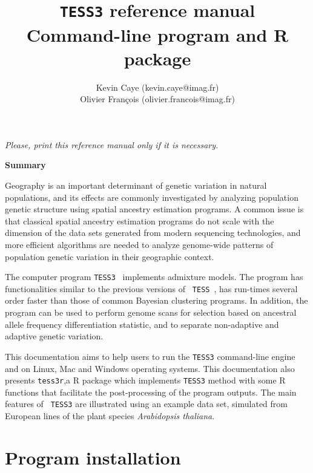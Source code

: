 \documentclass[10pt,a4paper]{article}
\title{{\tt TESS3} reference manual \\
Command-line program and R package
}
\author{
        Kevin Caye (kevin.caye@imag.fr)\\
        Olivier Fran\c cois (olivier.francois@imag.fr)\\
}
\begin{document}
\maketitle
\begin{center}
{\it Please, print this reference manual only if it is necessary.}
\end{center}

\vspace{.5cm}

\begin{center} {\bf Summary}
\end{center}


\vspace{.5cm}

Geography is an important determinant of genetic variation in natural 
populations, and its effects are commonly investigated by analyzing population 
genetic structure using spatial ancestry estimation programs. A common issue is 
that classical spatial ancestry estimation programs do not scale with the 
dimension of the data sets generated from modern sequencing technologies, and 
more efficient algorithms are needed to analyze genome-wide patterns of 
population genetic variation in their geographic context.

The computer program {\tt TESS3}~\cite{TESS3} implements admixture models. The program has 
functionalities similar to the previous versions of {\tt 
TESS}~\cite{chen2007bayesian,durand2009spatial}, has run-times several order 
faster than those of common Bayesian clustering programs. In addition, the 
program can be used to perform genome scans for selection based on ancestral 
allele frequency differentiation statistic, and to separate non-adaptive and 
adaptive genetic variation.

This documentation aims to help users to run the {\tt TESS3} command-line engine 
and on Linux, Mac and Windows operating systems. This documentation also presents {\tt tess3r},a R package 
which implements {\tt TESS3} method with some R functions that facilitate the 
post-processing of the program outputs. The main features of {\tt 
TESS3} are illustrated using an example data set, simulated from European lines 
of the plant species {\it Arabidopsis thaliana}.

\vspace{.5cm}


\section{Program installation} 
\end{document}
